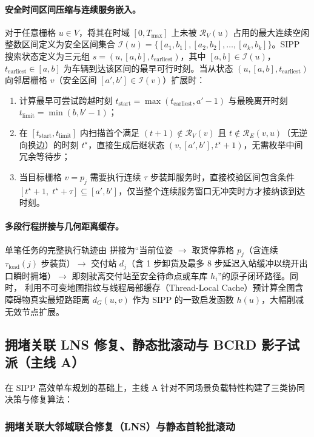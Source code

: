 \paragraph{安全时间区间压缩与连续服务嵌入。} 对于任意栅格 $u \in V$，将其在时域 $[0, T_{\max}]$ 上未被 $\mathcal{R}_V(u)$ 占用的最大连续空闲整数区间定义为安全区间集合 $\mathcal{I}(u) = \{[a_1, b_1], [a_2, b_2], \dots, [a_k, b_k]\}$。SIPP 搜索状态定义为三元组 $s = (u, [a, b], t_{\text{earliest}})$，其中 $[a, b] \in \mathcal{I}(u)$，$t_{\text{earliest}} \in [a, b]$ 为车辆到达该区间的最早可行时刻。当从状态 $(u, [a, b], t_{\text{earliest}})$ 向邻居栅格 $v$（安全区间 $[a', b'] \in \mathcal{I}(v)$）扩展时：
\begin{enumerate}
  \item 计算最早可尝试跨越时刻 $t_{\text{start}} = \max(t_{\text{earliest}}, a' - 1)$ 与最晚离开时刻 $t_{\text{limit}} = \min(b, b' - 1)$；
  \item 在 $[t_{\text{start}}, t_{\text{limit}}]$ 内扫描首个满足 $(t+1) \notin \mathcal{R}_V(v)$ 且 $t \notin \mathcal{R}_E(v, u)$（无逆向换边）的时刻 $t^\star$，直接生成后继状态 $(v, [a', b'], t^\star + 1)$，无需枚举中间冗余等待步；
  \item 当目标栅格 $v = p_j$ 需要执行连续 $\tau$ 步装卸服务时，直接校验区间包含条件 $[t^\star + 1,\; t^\star + \tau] \subseteq [a', b']$，仅当整个连续服务窗口无冲突时方才接纳该到达时刻。
\end{enumerate}

\paragraph{多段行程拼接与几何距离缓存。} 单笔任务的完整执行轨迹由  拼接为“当前位姿 $\to$ 取货停靠格 $p_j$（含连续 $\tau_{\text{load}}(j)$ 步装货）$\to$ 交付站 $d_j$（含 1 步卸货及最多 8 步延迟入站缓冲以绕开出口瞬时拥堵）$\to$ 即刻驶离交付站至安全待命点或车库 $h_i$”的原子闭环路径。同时， 利用不可变地图指纹与线程局部缓存（Thread-Local Cache）预计算全图含障碍物真实最短路距离 $d_G(u, v)$ 作为 SIPP 的一致启发函数 $h(u)$，大幅削减无效节点扩展。

\subsection{拥堵关联 LNS 修复、静态批滚动与 BCRD 影子试派（主线 A）}

在 SIPP 高效单车规划的基础上，主线 A 针对不同场景负载特性构建了三类协同决策与修复算法：

\subsubsection{拥堵关联大邻域联合修复（LNS）与静态首轮批滚动}


